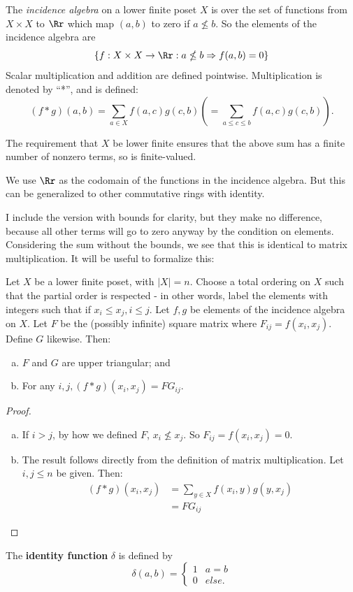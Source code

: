 \documentclass[12pt]{pom_thesis}
\begin{document}
\begin{defn}
The \emph{incidence algebra} on a lower finite poset $X$ is over the set of functions from $X \times X$ to $\Rr$ which map $(a,b)$ to zero if $a \nleq b$. So the elements of the incidence algebra are 
\[\{f:X \times X \rightarrow \Rr:a \nleq b \Rightarrow f(a,b) = 0\}
\]
Scalar multiplication and addition are defined pointwise.  Multiplication is denoted by ``*'', and is defined:
\[(f* g)(a,b) = \sum_{a \in X}f(a,c)g(c,b) \left( = \sum_{a \leq c \leq b}f(a,c)g(c,b)\right).\]
\end{defn}
\begin{rmk}
The requirement that $X$ be lower finite ensures that the above sum has a finite number of nonzero terms, so is finite-valued.
\end{rmk}
\begin{rmk}
We use $\Rr$ as the codomain of the functions in the incidence algebra. But this can be generalized to other commutative rings with identity.
\end{rmk}
I include the version with bounds for clarity, but they make no difference, because all other terms will go to zero anyway by the condition on elements. Considering the sum without the bounds, we see that this is identical to matrix multiplication. It will be useful to formalize this:
\begin{lemma}\label{mat_eq}
Let $X$ be a lower finite poset, with $|X|=n$. Choose a total ordering on $X$ such that the partial order is respected - in other words, label the elements with integers such that if $x_i \leq x_j, i \leq j$. Let $f,g$ be elements of the incidence algebra on $X$. Let $F$ be the (possibly infinite) square matrix where $F_{ij}=f(x_i, x_j)$. Define $G$ likewise. Then:
\begin{enumerate}[a)]
\item $F$ and $G$ are upper triangular; and
\item For any $i,j, (f * g)(x_i, x_j)=FG_{ij}$.
\end{enumerate}
\end{lemma}
\begin{proof}
\begin{enumerate}[a)]
\item If $i>j$, by how we defined $F$, $x_i \nleq x_j$. So $F_{ij} = f(x_i, x_j) = 0$. 
\item
The result follows directly from the definition of matrix multiplication. Let $i,j\leq n$ be given. Then:
\begin{align*}
(f * g)(x_i, x_j) &= \sum_{y \in X} f(x_i,y)g(y,x_j)\\
&=FG_{ij}
\end{align*}
\end{enumerate}
\end{proof}



The \textbf{identity function} $\delta$ is defined by 
\[\delta(a,b) = \begin{cases} 1 & a = b \\ 0 & else. \end{cases}
\]
\fi
\end{document}
